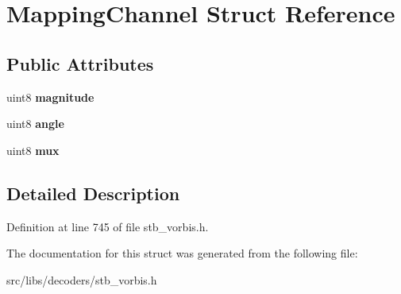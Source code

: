 \hypertarget{structMappingChannel}{\section{Mapping\-Channel Struct Reference}
\label{structMappingChannel}
}
\subsection*{Public Attributes}
\begin{DoxyCompactItemize}
\item 
\hypertarget{structMappingChannel_afd6e4cb4de3874833192c5c67daaa272}{uint8 {\bfseries magnitude}}\label{structMappingChannel_afd6e4cb4de3874833192c5c67daaa272}

\item 
\hypertarget{structMappingChannel_a78fa29206ca367159792f11c1f604510}{uint8 {\bfseries angle}}\label{structMappingChannel_a78fa29206ca367159792f11c1f604510}

\item 
\hypertarget{structMappingChannel_a293cfec33390fdd5cee99df910f2d694}{uint8 {\bfseries mux}}\label{structMappingChannel_a293cfec33390fdd5cee99df910f2d694}

\end{DoxyCompactItemize}


\subsection{Detailed Description}


Definition at line 745 of file stb\-\_\-vorbis.\-h.



The documentation for this struct was generated from the following file\-:\begin{DoxyCompactItemize}
\item 
src/libs/decoders/stb\-\_\-vorbis.\-h\end{DoxyCompactItemize}
